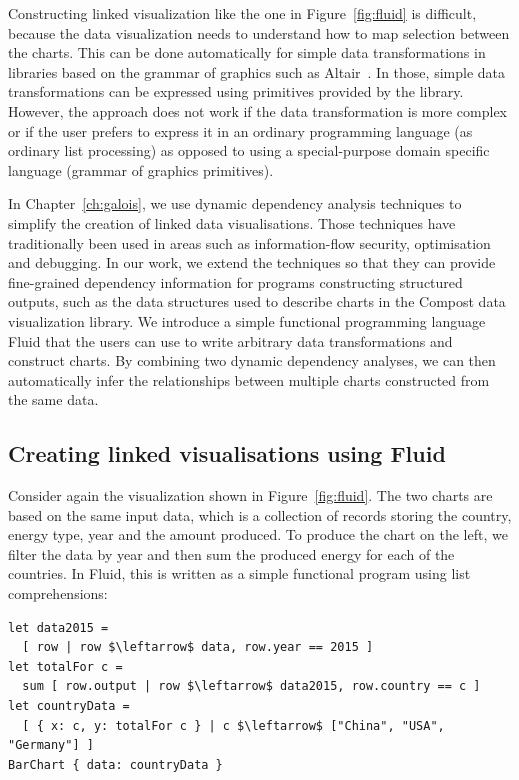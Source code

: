 \documentclass[fleqn,11pt]{report}
\theoremstyle{definition}
\begin{document}
Constructing linked visualization like the one in Figure~\ref{fig:fluid} is difficult,
because the data visualization needs to understand how to map selection between the charts.
This can be done automatically for simple data transformations in libraries based on the
grammar of graphics such as Altair~\citep{vanderplas-2018-altair}. In those, simple data
transformations can be expressed using primitives provided by the library. However, the
approach does not work if the data transformation is more complex or if the user prefers to
express it in an ordinary programming language (as ordinary list processing) as opposed to
using a special-purpose domain specific language (grammar of graphics primitives).

In Chapter~\ref{ch:galois}, we use dynamic dependency analysis techniques
to simplify the creation of linked data visualisations. Those techniques have
traditionally been used in areas such as information-flow security, optimisation and
debugging. In our work, we extend the techniques so that they can provide fine-grained
dependency information for programs constructing structured outputs, such as the data structures
used to describe charts in the Compost data visualization library. We introduce a simple
functional programming language Fluid that the users can use to write arbitrary data
transformations and construct charts. By combining two dynamic dependency analyses, we can
then automatically infer the relationships between multiple charts constructed from the
same data.

\subsection{Creating linked visualisations using Fluid}

Consider again the visualization shown in Figure~\ref{fig:fluid}. The two charts are
based on the same input data, which is a collection of records storing the country, energy
type, year and the amount produced. To produce the chart on the left, we filter the data by
year and then sum the produced energy for each of the countries. In Fluid, this is written as
a simple functional program using list comprehensions:
%
\begin{lstlisting}[language=fluid,mathescape=true]
let data2015 =
  [ row | row $\leftarrow$ data, row.year == 2015 ]
let totalFor c =
  sum [ row.output | row $\leftarrow$ data2015, row.country == c ]
let countryData =
  [ { x: c, y: totalFor c } | c $\leftarrow$ ["China", "USA", "Germany"] ]
BarChart { data: countryData }
\end{lstlisting}
\end{document}
